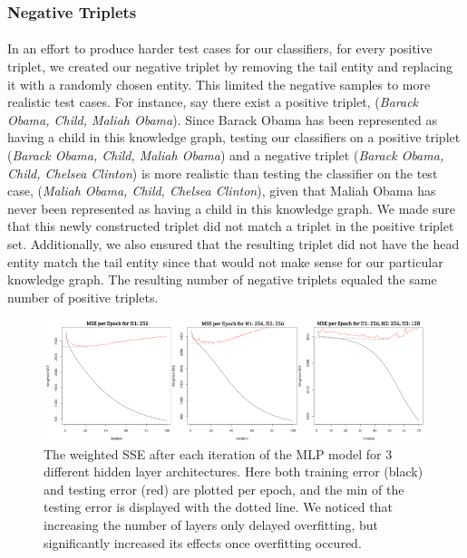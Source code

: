\documentclass[11.5pt]{article}
\newcounter{graphics}
\begin{document}
\subsubsection{Negative Triplets} 
\paragraph{} In an effort to produce harder test cases for our classifiers, for every positive triplet, we created our negative triplet by removing the tail  entity and replacing it with a randomly chosen entity. This limited the negative samples to more realistic test cases. For instance, say there exist a positive triplet, (\textit{Barack Obama, Child, Maliah Obama}). Since Barack Obama has been represented as having a child in this knowledge graph, testing our classifiers on a positive triplet (\textit{Barack Obama, Child, Maliah Obama}) and a negative triplet (\textit{Barack Obama, Child, Chelsea Clinton}) is more realistic than testing the classifier on the test case, (\textit{Maliah Obama, Child, Chelsea Clinton}), given that Maliah Obama has never been represented as having a child in this knowledge graph.  We made sure that this newly constructed triplet did not match a triplet in the positive triplet set. Additionally, we also ensured that the resulting triplet did not have the head entity match the tail entity since that would not make sense for our particular knowledge graph. The resulting number of negative triplets equaled the same number of positive triplets.



\begin{figure}[h!]
\centerline{\includegraphics[width=1\textwidth]{report_mlp/MSEperEpochMLP.png}}
  \caption{\small  The weighted SSE after each iteration of the MLP model for 3 different hidden layer architectures. Here both training error (black) and testing error (red) are plotted per epoch, and the min of the testing error is displayed with the dotted line. We noticed that increasing the number of layers only delayed overfitting, but significantly increased its effects once overfitting occured.  }
\label{MSEperEpochMLP}
\end{figure}
\end{document}
